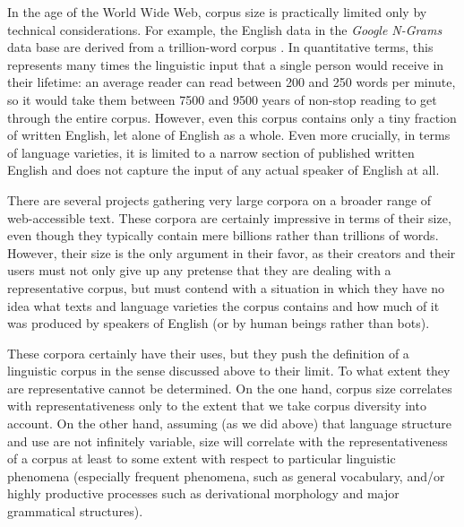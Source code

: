 In the age of the World Wide Web, corpus size  is practically limited only by technical considerations. For example, the English data in the \emph{Google N\hyp{}Grams}  data base are derived from a trillion\hyp{}word corpus \citep[cf.][]{franz_all_2006}. In quantitative terms, this represents many times the linguistic input that a single person would receive in their lifetime: an average reader can read between 200 and 250 words per minute, so it would take them between \num{7500} and \num{9500} years of non\hyp{}stop reading to get through the entire corpus. However, even this corpus contains only a tiny fraction of written  English, let alone of English as a whole. Even more crucially, in terms of language varieties,  it is limited to a narrow section of published written English and does not capture the input of any actual speaker of English at all.

There are several projects gathering very large  corpora on a broader range of web\hyp{}accessible text. These corpora are certainly impressive in terms of their size, even though they typically contain mere billions rather than trillions of words. However, their size  is the only argument in their favor, as their creators and their users must not only give up any pretense that they are dealing with a representative corpus, but must contend with a situation in which they have no idea what texts and language varieties  the corpus contains and how much of it was produced by speakers of English (or by human beings rather than bots).

These corpora certainly have their uses, but they push the definition of a linguistic corpus in the sense discussed above to their limit. To what extent they are representative  cannot be determined. On the one hand, corpus size  correlates with representativeness only to the extent that we take corpus diversity into account. On the other hand, assuming (as we did above) that language structure and use are not infinitely variable, size  will correlate with the representativeness of a corpus at least to some extent with respect to particular linguistic phenomena (especially frequent phenomena, such as general vocabulary, and\slash or highly productive  processes such as derivational morphology  and major grammatical structures).

